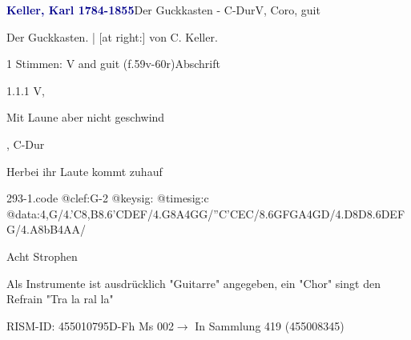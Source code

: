 \documentclass[twocolumn, 12pt]{book}
\begin{document}
\par \vspace{16pt} \textcolor{darkblue}{\textbf{Keller, Karl  1784-1855}}\hfillplus{\textbf{[293]}}\newline Der Guckkasten - C-Dur\newline V, Coro, guit
\par \begin{itshape}[heading, f.59v:] Der Guckkasten. | [at right:] von C. Keller.\end{itshape} 
\par \textcolor{darkblue}{}  1 Stimmen: V and guit  (f.59v-60r)\newline Abschrift
\par 1.1.1  V, \begin{itshape}Mit Laune aber nicht geschwind\end{itshape}, C-Dur\newline \begin{footnotesize} Herbei ihr Laute kommt zuhauf \end{footnotesize}  
\begin{filecontents*}{293-1.code}
@clef:G-2
@keysig:
@timesig:c
@data:4,G/4.'C8,B{8.6'CD}{EF}/4.G8A4GG/''C'CEC/8.6{GF}GA4GD/4.D8D{8.6DE}{FG}/4.A8bB4AA/
\end{filecontents*}
\newline %
\par Acht Strophen
\par Als Instrumente ist ausdrücklich "Guitarre" angegeben, ein "Chor" singt den Refrain "Tra la ral la"
\par RISM-ID: 455010795\newline D-Fh  Ms 002\newline $\rightarrow$ In Sammlung 419 (455008345)
      
\end{document}
